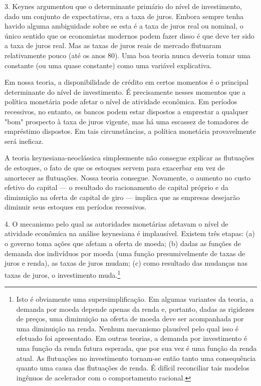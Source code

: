 \documentclass[12pt]{article}
\begin{document}
3. Keynes argumentou que o determinante primário do nível de investimento, dado um conjunto de expectativas, era a taxa de juros. Embora sempre tenha havido alguma ambiguidade sobre se esta é a taxa de juros real ou nominal, o único sentido que os economistas modernos podem fazer disso é que deve ter sido a taxa de juros real. Mas as taxas de juros reais de mercado flutuaram relativamente pouco (até os anos 80). Uma boa teoria nunca deveria tomar uma constante (ou uma quase constante) como uma variável explicativa.

Em nossa teoria, a disponibilidade de crédito em certos momentos é o principal determinante do nível de investimento. É precisamente nesses momentos que a política monetária pode afetar o nível de atividade econômica. Em períodos recessivos, no entanto, os bancos podem estar dispostos a emprestar a qualquer "bom" prospecto à taxa de juros vigente, mas há uma escassez de tomadores de empréstimo dispostos. Em tais circunstâncias, a política monetária provavelmente será ineficaz.

A teoria keynesiana-neoclássica simplesmente não consegue explicar as flutuações de estoques, o fato de que os estoques servem para exacerbar em vez de amortecer as flutuações. Nossa teoria consegue. Novamente, o aumento no custo efetivo do capital — o resultado do racionamento de capital próprio e da diminuição na oferta de capital de giro — implica que as empresas desejarão diminuir seus estoques em períodos recessivos.

4. O mecanismo pelo qual as autoridades monetárias afetavam o nível de atividade econômica na análise keynesiana é implausível. Existem três etapas: (a) o governo toma ações que afetam a oferta de moeda; (b) dadas as funções de demanda dos indivíduos por moeda (uma função presumivelmente de taxas de juros e renda), as taxas de juros mudam; (c) como resultado das mudanças nas taxas de juros, o investimento muda.\footnote{Isto é obviamente uma supersimplificação. Em algumas variantes da teoria, a demanda por moeda depende apenas da renda e, portanto, dadas as rigidezes de preços, uma diminuição na oferta de moeda deve ser acompanhada por uma diminuição na renda. Nenhum mecanismo plausível pelo qual isso é efetuado foi apresentado. Em outras teorias, a demanda por investimento é uma função da renda futura esperada, que por sua vez é uma função da renda atual. As flutuações no investimento tornam-se então tanto uma consequência quanto uma causa das flutuações de renda. É difícil reconciliar tais modelos ingênuos de acelerador com o comportamento racional.}
\end{document}
